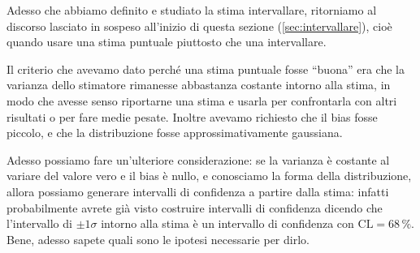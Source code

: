 Adesso che abbiamo definito e studiato la stima intervallare, ritorniamo al
discorso lasciato in sospeso all'inizio di questa sezione
(\ref{sec:intervallare}), cioè quando usare una stima puntuale piuttosto che
una intervallare.

Il criterio che avevamo dato perché una stima puntuale fosse ``buona'' era che
la varianza dello stimatore rimanesse abbastanza costante intorno alla stima,
in modo che avesse senso riportarne una stima e usarla per confrontarla con
altri risultati o per fare medie pesate. Inoltre avevamo richiesto che il bias
fosse piccolo, e che la distribuzione fosse approssimativamente gaussiana.

Adesso possiamo fare un'ulteriore considerazione: se la varianza è costante al
variare del valore vero e il bias è nullo, e conosciamo la forma della
distribuzione, allora possiamo generare intervalli di confidenza a partire
dalla stima: infatti probabilmente avrete già visto costruire intervalli
di confidenza dicendo che l'intervallo di $\pm 1 \sigma$ intorno alla stima è
un intervallo di confidenza con $\mathrm{CL} = 68\,\%$. Bene, adesso sapete
quali sono le ipotesi necessarie per dirlo.
